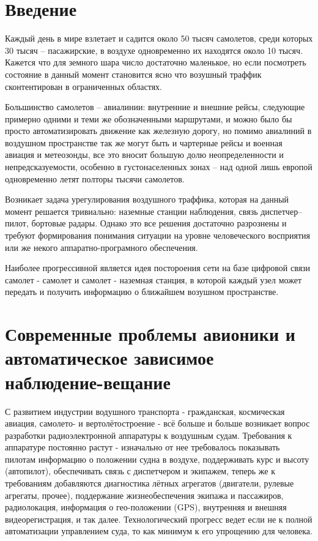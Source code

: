 \documentclass[a4paper,12pt]{report} %
\begin{document}
\tableofcontents

\setlength{\parskip}{1em}
\chapter{Введение} %

Каждый день в мире взлетает и садится около 50 тысяч самолетов, среди
которых 30 тысяч -- пасажирские, в воздухе одновременно их находятся около 10
тысяч. Кажется что для земного шара число достаточно маленькое, но если
посмотреть состояние в данный момент становится ясно что возушный траффик
сконтентирован в ограниченных областях.

Большинство самолетов -- авиалинии: внутренние и внешние рейсы, следующие
примерно одними и теми же обозначенными маршрутами, и можно было бы просто
автоматизировать движение как железную дорогу, но помимо авиалиний в воздушном
пространстве так же могут быть и чартерные рейсы и военная авиация и метеозонды,
все это вносит большую долю неопределенности и непредсказуемости, особенно в
густонаселенных зонах -- над одной лишь европой одновременно летят полторы тысячи
самолетов.

Возникает задача урегулирования воздушного траффика, которая на данный момент
решается тривиально: наземные станции наблюдения, связь диспетчер--пилот,
бортовые радары. Однако это все решения достаточно разрознены и требуют
формирования понимания ситуации на уровне человеческого восприятия или же некого
аппаратно-програмного обеспечения.

Наиболее прогрессивной является идея постороения сети на базе цифровой связи
самолет - самолет и самолет - наземная станция, в которой каждый узел может
передать и получить информацию о ближайшем возушном пространстве.
\newpage
\chapter{Современные проблемы авионики и автоматическое зависимое
  наблюдение-вещание} %

С развитием индустрии водушного транспорта - гражданская, космическая авиация,
самолето- и вертолётостроение - всё больше и больше возникает вопрос разработки
радиоэлектронной аппаратуры к воздушным судам. Требования к аппаратуре постоянно
растут - изначально от нее требовалось показывать пилотам информацию о положении
судна в воздухе, поддерживать курс и высоту (автопилот), обеспечивать связь с
диспетчером и экипажем, теперь же к требованиям добавляются диагностика лётных
агрегатов (двигатели, рулевые агрегаты, прочее), поддержание жизнеобеспечения
экипажа и пассажиров, радиолокация, информация о гео-положении
(GPS), внутренняя и внешняя видеорегистрация, и так далее. Технологический
прогресс ведет если не к полной автоматизации управлением суда, то как минимум к
его упрощению для человека.
\end{document}
